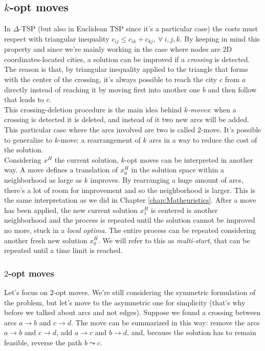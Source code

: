 \subsection{$k$-opt moves}

In $\Delta$-TSP (but also in Euclidean TSP since it's a particular case) the
costs must respect with triangular inequality $c_{ij} \leq c_{ik} + c_{kj},\
\forall\ i, j, k$. By keeping in mind this  property and since we're mainly
working in the case where nodes are 2D coordinates-located cities, a solution
can be improved if a \emph{crossing} is detected. The reason is that, by
triangular inequality applied to the triangle that forms with the center of
the crossing, it's always possible to reach the city $c$ from $a$ directly instead
of reaching it by moving first into another one $b$ and then follow
that leads to $c$.\\
This crossing-deletion procedure is the main idea behind \emph{$k$-moves}:
when a crossing is detected it is deleted, and instead of it two new arcs will be
added. This particular case where the arcs involved are two is called $2$-move.
It's possible to generalize to $k$-move: a rearrangement of $k$ arcs in a way to
reduce the cost of the solution.\\

Considering $x^H$ the current solution, $k$-opt moves can be interpreted in another
way. A move defines a translation of $x^H_0$ in the solution space within a
neighborhood as large as $k$ improves. By rearranging a huge amount of arcs,
there's a lot of room for improvement and so the neighborhood is larger. This is
the same interpretation as we did in Chapter \ref{chap:Matheuristics}. After
a move has  been applied, the new current solution $x^H_1$ is centered is
another neighborhood and the process is repeated until the solution cannot be
improved no more, stuck in a \emph{local optima}. The entire process can be
repeated considering another fresh new solution $x^H_0$. We will refer to this
as \emph{multi-start}, that can be repeated until a time limit is reached.

\subsubsection{$2$-opt moves}
Let's focus on $2$-opt moves. We're still considering the symmetric formulation of
the problem, but let's move to the asymmetric one for simplicity (that's why
before we talked about arcs and not edges). Suppose we found a crossing between
arcs $a \rightarrow b$ and $c \rightarrow d$. The move can be summarized in this
way: remove the arcs $a \rightarrow b$ and $c \rightarrow d$, add $a \rightarrow
c$ and $b \rightarrow d$, and, because the solution has to remain feasible,
reverse the path $b \leadsto c$.


